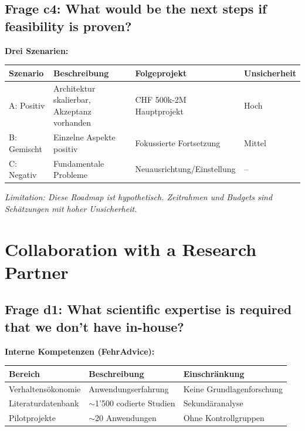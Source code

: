 \documentclass[11pt,a4paper]{article}
\newcommand{\limitation}[1]{\textcolor{limitation}{\textit{Limitation: #1}}}
\begin{document}
\subsection{Frage c4: What would be the next steps if feasibility is proven?}

\textbf{Drei Szenarien:}

\begin{table}[h]
\centering
\begin{tabular}{@{}L{2.5cm}L{5cm}L{3.5cm}C{2.5cm}@{}}
\toprule
\textbf{Szenario} & \textbf{Beschreibung} & \textbf{Folgeprojekt} & \textbf{Unsicherheit} \\
\midrule
A: Positiv & Architektur skalierbar, Akzeptanz vorhanden & CHF 500k-2M Hauptprojekt & Hoch \\
B: Gemischt & Einzelne Aspekte positiv & Fokussierte Fortsetzung & Mittel \\
C: Negativ & Fundamentale Probleme & Neuausrichtung/Einstellung & -- \\
\bottomrule
\end{tabular}
\end{table}

\limitation{Diese Roadmap ist hypothetisch. Zeitrahmen und Budgets sind Schätzungen mit hoher Unsicherheit.}

\newpage
\section{Collaboration with a Research Partner}

\subsection{Frage d1: What scientific expertise is required that we don't have in-house?}

\textbf{Interne Kompetenzen (FehrAdvice):}

\begin{table}[h]
\centering
\begin{tabular}{@{}L{4cm}L{5cm}L{4.5cm}@{}}
\toprule
\textbf{Bereich} & \textbf{Beschreibung} & \textbf{Einschränkung} \\
\midrule
Verhaltensökonomie & Anwendungserfahrung & Keine Grundlagenforschung \\
Literaturdatenbank & $\sim$1'500 codierte Studien & Sekundäranalyse \\
Pilotprojekte & $\sim$20 Anwendungen & Ohne Kontrollgruppen \\
\bottomrule
\end{tabular}
\end{table}
\end{document}
